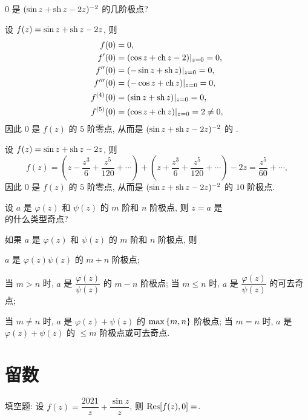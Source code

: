 \begin{exercise}
	$0$ 是 $(\sin z+\operatorname{sh} z-2z)^{-2}$ 的几阶极点?
\end{exercise}
\begin{solution}
	设 $f(z)=\sin z+\operatorname{sh} z-2z$, 则
	\begin{align*}
		f(0)&=0,\\
		f'(0)&=(\cos z+\operatorname{ch} z-2)|_{z=0}=0,\\
		f''(0)&=(-\sin z+\operatorname{sh} z)|_{z=0}=0,\\
		f'''(0)&=(-\cos z+\operatorname{ch} z)|_{z=0}=0,\\
		f^{(4)}(0)&=(\sin z+\operatorname{sh} z)|_{z=0}=0,\\
		f^{(5)}(0)&=(\cos z+\operatorname{ch} z)|_{z=0}=2\neq0,
	\end{align*}
	因此 $0$ 是 $f(z)$ 的 $5$ 阶零点, 从而是 $(\sin z+\operatorname{sh} z-2z)^{-2}$ 的 .
\end{solution}
\begin{solution}[另解]
	设 $f(z)=\sin z+\operatorname{sh} z-2z$, 则
	\[f(z)=\left(z-\frac{z^3}{6}+\frac{z^5}{120}+\cdots\right)
	+\left(z+\frac{z^3}{6}+\frac{z^5}{120}+\cdots\right)-2z
	=\frac{z^5}{60}+\cdots,\]
	因此 $0$ 是 $f(z)$ 的 $5$ 阶零点, 从而是 $(\sin z+\operatorname{sh} z-2z)^{-2}$ 的 $10$ 阶极点.
\end{solution}


\begin{exercise}[3]
	设 $a$ 是 $\varphi(z)$ 和 $\psi(z)$ 的 $m$ 阶和 $n$ 阶极点, 则 $z=a$ 是
	\\
	的什么类型奇点?
\end{exercise}
\begin{solution}
	如果 $a$ 是 $\varphi(z)$ 和 $\psi(z)$ 的 $m$ 阶和 $n$ 阶极点, 则

	\subex $a$ 是 $\varphi(z)\psi(z)$ 的 $m+n$ 阶极点;

	\subex 当 $m>n$ 时, $a$ 是 $\dfrac{\varphi(z)}{\psi(z)}$ 的 $m-n$ 阶极点; 当 $m\le n$ 时, $a$ 是 $\dfrac{\varphi(z)}{\psi(z)}$ 的可去奇点;

	\subex 当 $m\neq n$ 时, $a$ 是 $\varphi(z)+\psi(z)$ 的 $\max{\left\{m,n\right\}}$ 阶极点; 当 $m=n$ 时, $a$ 是 $\varphi(z)+\psi(z)$ 的 $\le m$ 阶极点或可去奇点.
\end{solution}


\section{留数}

\begin{exercise}
	填空题: 设 $f(z)=\dfrac{2021}z+\dfrac{\sin z}z$, 则 ${\mathrm{Res}}[f(z),0]=$.
\end{exercise}


